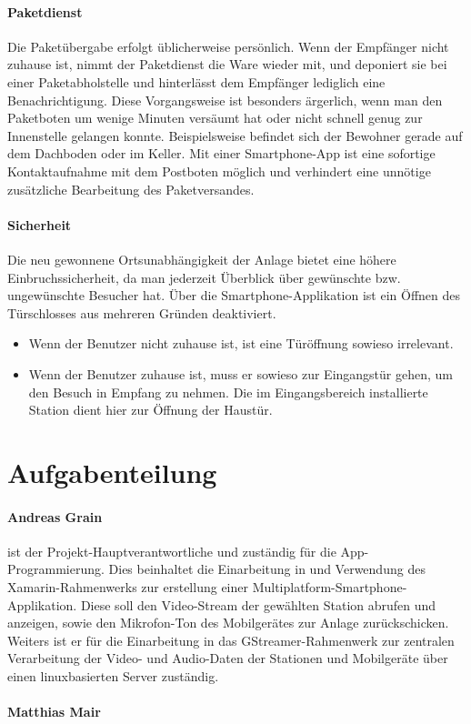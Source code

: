 \paragraph{Paketdienst}
Die Paketübergabe erfolgt üblicherweise persönlich.
Wenn der Empfänger nicht zuhause ist, nimmt der Paketdienst die Ware wieder mit, und deponiert sie bei einer Paketabholstelle und hinterlässt dem Empfänger lediglich eine Benachrichtigung.
Diese Vorgangsweise ist besonders ärgerlich, wenn man den Paketboten um wenige Minuten versäumt hat oder nicht schnell genug zur Innenstelle gelangen konnte.
Beispielsweise befindet sich der Bewohner gerade auf dem Dachboden oder im Keller.
Mit einer Smartphone-App ist eine sofortige Kontaktaufnahme mit dem Postboten möglich und verhindert eine unnötige zusätzliche Bearbeitung des Paketversandes.

\paragraph{Sicherheit}
Die neu gewonnene Ortsunabhängigkeit der Anlage bietet eine höhere Einbruchssicherheit, da man jederzeit Überblick über gewünschte bzw. ungewünschte Besucher hat.
Über die Smartphone-Applikation ist ein Öffnen des Türschlosses aus mehreren Gründen deaktiviert.
\begin{itemize}
    \item Wenn der Benutzer nicht zuhause ist, ist eine Türöffnung sowieso irrelevant.
    \item Wenn der Benutzer zuhause ist, muss er sowieso zur Eingangstür gehen, um den Besuch in Empfang zu nehmen. Die im Eingangsbereich installierte Station dient hier zur Öffnung der Haustür.
\end{itemize}

\section{Aufgabenteilung}
\paragraph{Andreas Grain} ist der Projekt-Hauptverantwortliche und zuständig für die App-Program\-mierung.
Dies beinhaltet die Einarbeitung in und Verwendung des Xamarin-Rahmenwerks zur erstellung einer Multiplatform-Smartphone-Applikation.
Diese soll den Video-Stream der gewählten Station abrufen und anzeigen, sowie den Mikrofon-Ton des Mobilgerätes zur Anlage zurückschicken.
Weiters ist er für die Einarbeitung in das GStreamer-Rahmenwerk zur zentralen Verarbeitung der Video- und Audio-Daten der Stationen und Mobilgeräte über einen linuxbasierten Server zuständig.

\paragraph{Matthias Mair}